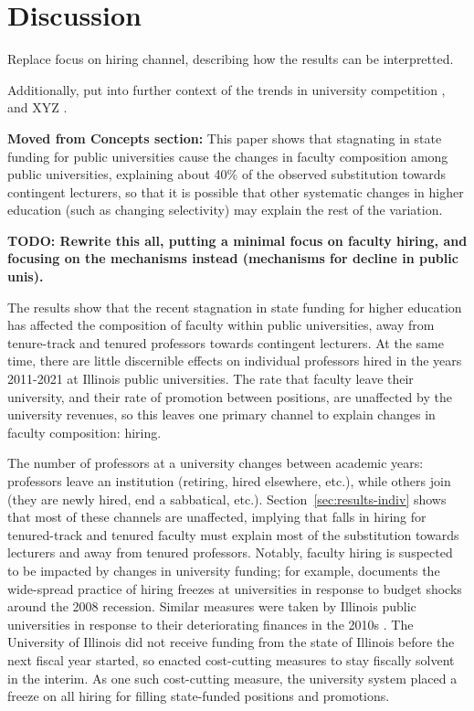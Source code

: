 \section{Discussion}

Replace focus on hiring channel, describing how the results can be interpretted.

Additionally, put into further context of the trends in university competition \citep{urquiola2020markets}, and XYZ \citep{ehrenberg2012american}.

\textbf{Moved from Concepts section:}
This paper shows that stagnating in state funding for public universities cause the changes in faculty composition among public universities, explaining about 40\% of the observed substitution towards contingent lecturers, so that it is possible that other systematic changes in higher education (such as changing selectivity) may explain the rest of the variation.

\textbf{TODO: Rewrite this all, putting  a minimal focus on faculty hiring, and focusing on the mechanisms instead (mechanisms for decline in public unis).}


The results show that the recent stagnation in state funding for higher education has affected the composition of faculty within public universities, away from tenure-track and tenured professors towards contingent lecturers.
At the same time, there are little discernible effects on individual professors hired in the years 2011-2021 at Illinois public universities.
The rate that faculty leave their university, and their rate of promotion between positions, are unaffected by the university revenues, so this leaves one primary channel to explain changes in faculty composition: hiring.

The number of professors at a university changes between academic years: professors leave an institution (retiring, hired elsewhere, etc.), while others join (they are newly hired, end a sabbatical, etc.).
Section~\ref{sec:results-indiv} shows that most of these channels are unaffected, implying that falls in hiring for tenured-track and tenured faculty must explain most of the substitution towards lecturers and away from tenured professors.
Notably, faculty hiring is suspected to be impacted by changes in university funding; for example, \cite{turner2014impact} documents the wide-spread practice of hiring freezes at universities in response to budget shocks around the 2008 recession.
Similar measures were taken by Illinois public universities in response to their deteriorating finances in the 2010s \citep{furlough2010}.
The University of Illinois did not receive funding from the state of Illinois before the next fiscal year started, so enacted cost-cutting measures to stay fiscally solvent in the interim.
As one such cost-cutting measure, the university system placed a freeze on all hiring for filling state-funded positions and promotions.

